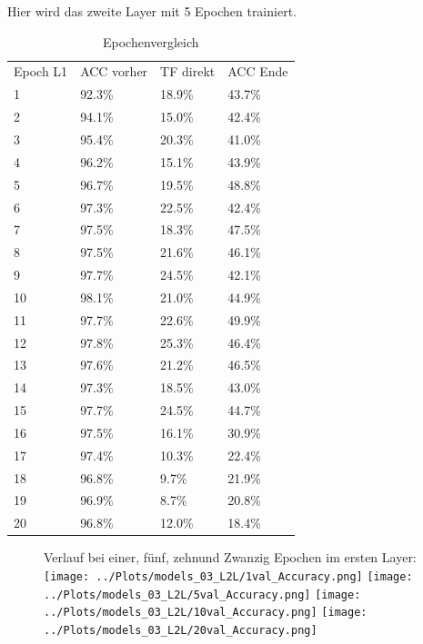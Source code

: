     Hier wird das zweite Layer mit 5 Epochen trainiert.
    \begin{table}[h!]
        \begin{center}
            \caption{Epochenvergleich}
            \label{tab3:Table}
            \begin{tabular}{l|l|l|l}
                Epoch L1 & ACC vorher & TF direkt & ACC Ende \\
                1 & 92.3\% & 18.9\% & 43.7\% \\
                2 & 94.1\% & 15.0\% & 42.4\% \\
                3 & 95.4\% & 20.3\% & 41.0\% \\
                4 & 96.2\% & 15.1\% & 43.9\% \\
                5 & 96.7\% & 19.5\% & 48.8\% \\
                6 & 97.3\% & 22.5\% & 42.4\% \\
                7 & 97.5\% & 18.3\% & 47.5\% \\
                8 & 97.5\% & 21.6\% & 46.1\% \\
                9 & 97.7\% & 24.5\% & 42.1\% \\
                10 & 98.1\% & 21.0\% & 44.9\% \\
                11 & 97.7\% & 22.6\% & 49.9\% \\
                12 & 97.8\% & 25.3\% & 46.4\% \\
                13 & 97.6\% & 21.2\% & 46.5\% \\
                14 & 97.3\% & 18.5\% & 43.0\% \\
                15 & 97.7\% & 24.5\% & 44.7\% \\
                16 & 97.5\% & 16.1\% & 30.9\% \\
                17 & 97.4\% & 10.3\% & 22.4\% \\
                18 & 96.8\% & 9.7\% & 21.9\% \\
                19 & 96.9\% & 8.7\% & 20.8\% \\
                20 & 96.8\% & 12.0\% & 18.4\% \\
            \end{tabular}
        \end{center}
    \end{table}

    \begin{figure}[htpb]
        Verlauf bei einer, fünf, zehnund Zwanzig Epochen im ersten Layer:
        \texttt{[image: ../Plots/models\_03\_L2L/1val\_Accuracy.png]}
        \texttt{[image: ../Plots/models\_03\_L2L/5val\_Accuracy.png]}
        \texttt{[image: ../Plots/models\_03\_L2L/10val\_Accuracy.png]}
        \texttt{[image: ../Plots/models\_03\_L2L/20val\_Accuracy.png]}
    \end{figure}

